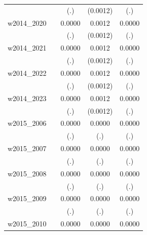 \begin{table}[htbp]
\begin{tabular}{l*{4}{c}}
            &                     &         (.)         &    (0.0012)         &         (.)         \\
[1em]
w2014\_2020  &                     &      0.0000         &      0.0012         &      0.0000         \\
            &                     &         (.)         &    (0.0012)         &         (.)         \\
[1em]
w2014\_2021  &                     &      0.0000         &      0.0012         &      0.0000         \\
            &                     &         (.)         &    (0.0012)         &         (.)         \\
[1em]
w2014\_2022  &                     &      0.0000         &      0.0012         &      0.0000         \\
            &                     &         (.)         &    (0.0012)         &         (.)         \\
[1em]
w2014\_2023  &                     &      0.0000         &      0.0012         &      0.0000         \\
            &                     &         (.)         &    (0.0012)         &         (.)         \\
[1em]
w2015\_2006  &                     &      0.0000         &      0.0000         &      0.0000         \\
            &                     &         (.)         &         (.)         &         (.)         \\
[1em]
w2015\_2007  &                     &      0.0000         &      0.0000         &      0.0000         \\
            &                     &         (.)         &         (.)         &         (.)         \\
[1em]
w2015\_2008  &                     &      0.0000         &      0.0000         &      0.0000         \\
            &                     &         (.)         &         (.)         &         (.)         \\
[1em]
w2015\_2009  &                     &      0.0000         &      0.0000         &      0.0000         \\
            &                     &         (.)         &         (.)         &         (.)         \\
[1em]
w2015\_2010  &                     &      0.0000         &      0.0000         &      0.0000         \\

\end{tabular}
\end{table}
